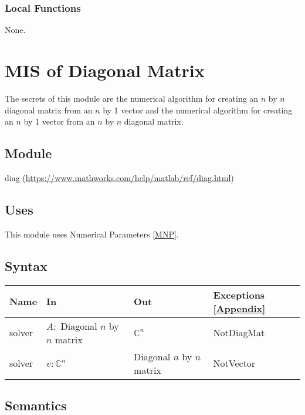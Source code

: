 \documentclass[12pt, titlepage]{article}
\begin{document}
\subsubsection{Local Functions} 

None. 

\newpage

\section{MIS of Diagonal Matrix} \label{MDM}

The secrets of this module are the numerical algorithm for creating an $n$ by 
$n$ diagonal 
matrix from an $n$ by 1 vector and the numerical algorithm for creating an $n$ 
by 1 vector from an $n$ by $n$ diagonal 
matrix. 

\subsection{Module}

diag (\url{https://www.mathworks.com/help/matlab/ref/diag.html})

\subsection{Uses}

This module uses Numerical Parameters \ref{MNP}. 

\subsection{Syntax}

\begin{center}
	\begin{tabular}{p{2cm} p{6cm} p{6cm} p{3cm}}
		\hline
		\textbf{Name} & \textbf{In} & \textbf{Out} & \textbf{Exceptions} 
		\ref{Appendix} \\
		\hline
		solver & $A :$ Diagonal $n$ by $n$ matrix  & $\mathbb{C}^{n}$ & 
		NotDiagMat \\ 
		solver & $v :\mathbb{C}^{n}$  & Diagonal $n$ by $n$ matrix & 
		NotVector \\
		\hline
	\end{tabular}
\end{center}

\subsection{Semantics}
\end{document}
